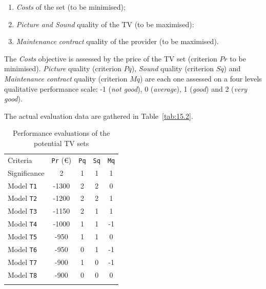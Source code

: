 \begin{enumerate}[topsep=3pt]
\item \emph{Costs} of the set (to be minimised); 
\item \emph{Picture and Sound} quality of the TV (to be maximised):
\item \emph{Maintenance contract} quality of the provider (to be maximised).
\end{enumerate}

The \emph{Costs} objective is assessed by the price of the TV set (criterion $Pr$ to be minimised). \emph{Picture} quality (criterion $Pq$), \emph{Sound} quality (criterion $Sq$) and \emph{Maintenance contract} quality (criterion $Mq$) are each one assessed on a four levels qualitative performance scale: -1 (\emph{not good}), 0 (\emph{average}), 1 (\emph{good}) and 2 (\emph{very good}).

The actual evaluation data are gathered in Table~\vref{tab:15.2}.
\begin{table}[ht]
\caption{Performance evaluations of the potential TV sets}
\label{tab:15.2}       %
\begin{center}
    \begin{tabular}{l|c|c|c|c}
      \svhline\noalign{\smallskip}
      Criteria & \texttt{Pr} (€) & \texttt{Pq} & \texttt{Sq} & \texttt{Mq} \\
      Significance & 2  & 1  & 1  & 1\\
      \noalign{\smallskip}\hline\noalign{\smallskip}
      Model \texttt{T1}   &     -1300  &  2  &  2  &   0\\
      Model \texttt{T2}   &     -1200  &  2  &  2  &   1\\
      Model \texttt{T3}   &     -1150  &  2  &  1  &   1\\
      Model \texttt{T4}   &     -1000  &  1  &  1  &  -1\\
      Model \texttt{T5}   &     -950   &  1  &  1  &   0\\
      Model \texttt{T6}   &     -950   &  0  &  1  &  -1\\
      Model \texttt{T7}   &     -900   &  1  &  0  &  -1\\
      Model \texttt{T8}   &     -900   &  0  &  0  &   0\\
      \noalign{\smallskip}\hline
    \end{tabular}
\end{center}
\end{table}

